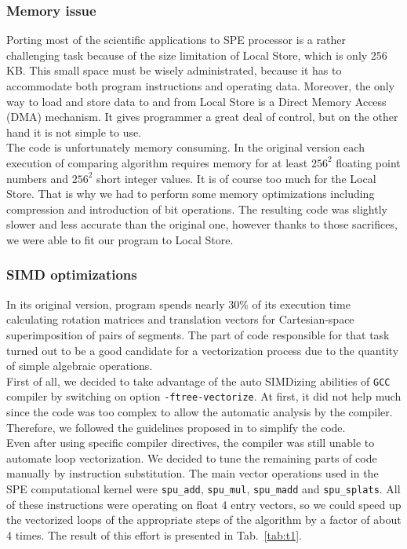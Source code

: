 \subsubsection{Memory issue}
Porting most of the scientific applications to SPE processor is a rather challenging task
because of the size limitation of Local Store, which is only 256 KB.
This small space must be wisely administrated, because it has to accommodate
both program instructions and operating data.
Moreover, the only way to load and store data to and from Local Store is a Direct Memory Access (DMA)
mechanism.
It gives programmer a great deal of control, but on the other hand it is not
simple to use.\\
The \prog{} code is unfortunately memory consuming.
In the original version each execution of comparing algorithm requires memory
for at least $256^2$ floating point numbers and $256^2$ short integer values.
It is of course too much for the Local Store.
That is why we had to perform some memory optimizations including compression
and introduction of bit operations.
The resulting code was slightly slower and less accurate than the original one, however
thanks to those sacrifices, we were able to fit our program to Local Store.

\subsubsection{SIMD optimizations}
In its original version, \prog{} program spends nearly
$30\%$ of its execution time calculating rotation matrices and translation
vectors for Cartesian-space superimposition of pairs of segments.
The part of code responsible for that task turned out to be a good candidate for
a vectorization process due to the quantity of simple algebraic operations.\\
First of all, we decided to take advantage of the auto SIMDizing abilities of \texttt{GCC} compiler by switching on option \texttt{-ftree-vectorize}.
At first, it did not help much since the code was too complex
to allow the automatic analysis by the compiler.
Therefore, we followed the guidelines proposed in \cite{rb} to simplify the code.\\
Even after using specific compiler directives, the compiler was still unable to automate loop vectorization.
We decided to tune the remaining parts of code manually by instruction
substitution.
The main vector operations used in the SPE computational kernel were
\texttt{spu\_add}, \texttt{spu\_mul}, \texttt{spu\_madd} and
\texttt{spu\_splats}.
All of these instructions were operating on float 4 entry vectors, so we could
speed up the vectorized loops of the appropriate steps of the algorithm by a factor of about
4 times.
The result of this effort is presented in Tab.~\ref{tab:t1}.

